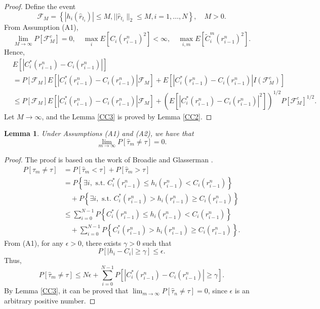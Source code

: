 \documentclass[10pt,a4paper]{amsart}
\numberwithin{equation}{section}
\newtheorem{lemma}[theo]{Lemma}
\begin{document}
\begin{proof}
Define the event
\[
 \mathcal{F}_M=\left\{\left|h_i\left(\hat{r}_{t_i}\right)\right| 
 \leq M,|| \hat{r}_{t_i} \|_2 \leq M, i=1, \dots, N\right\}, \quad M>0 .
\]
From Assumption (A1),
\[
 \lim _{M \to \infty} P\left[\mathcal{F}_M^c\right]=0, 
 \quad \max_i E\left[C_i\left(r_{i-1}^n\right)^2\right]<\infty,\quad
 \max _{i, m} E\left[\widetilde{C}_i^m\left(r_{i-1}^n\right)^2\right].
\]
Hence,
\begin{align*}
&E\left[\left|C_i^*\left(r_{i-1}^{n}\right)-C_i\left(r_{i-1}^{n}\right)\right|\right] \\
&=  P\left[\mathcal{F}_M\right] E\left[\left|C_i^*\left(r_{i-1}^{n}\right)-C_i\left(r_{i-1}^{n}\right)\right| \mathcal{F}_M\right]+E\left[\left|C_i^*\left(r_{i-1}^{n}\right)-C_i\left(r_{i-1}^{n}\right)\right| I\left(\mathcal{F}_M^c\right)\right] \\
&\leq  P\left[\mathcal{F}_M\right] E\left[\left|C_i^*\left(r_{i-1}^{n}\right)-C_i\left(r_{i-1}^{n}\right)\right| \mathcal{F}_M\right]+\left(E\left[\left|C_i^*\left(r_{i-1}^{n}\right)-C_i\left(r_{i-1}^{n}\right)\right|^2\right]\right)^{1/2} P\left[\mathcal{F}_M^c\right]^{1/2}.
\end{align*}
Let $M \to \infty$, and the Lemma \ref{CC3} is proved by Lemma \ref{CC2}.
\end{proof}

\begin{lemma}
\label{tau}
Under Assumptions {\rm (A1)} and {\rm (A2)}, we have that
 \[
 \lim _{m \to \infty} P\left[\hat{\tau}_m \neq \tau\right]=0 .
 \]
\end{lemma}

\begin{proof}
The proof is based on the work of Broadie and Glasserman \cite{broadie2004stochastic}.
\begin{align*}
P\left[\hat{\tau}_m \neq \tau\right]
&=  P\left[\hat{\tau}_m<\tau\right]+P\left[\hat{\tau}_m>\tau\right] \\
&=  P\left\{\exists i, \text{ s.t. } C_i^*\left(r_{i-1}^{n}\right) \leq h_i\left(r_{i-1}^{n}\right)< C_i\left(r_{i-1}^{n}\right)\right\} \\
&\quad +P\left\{\exists i, \text{ s.t. } C_i^*\left(r_{i-1}^{n}\right) 
 > h_i\left(r_{i-1}^{n}\right) \geq C_i\left(r_{i-1}^{n}\right)\right\} \\
&\leq  \sum_{i=0}^{N-1} P\left\{C_i^*\left(r_{i-1}^{n}\right) 
 \leq h_i\left(r_{i-1}^{n}\right)< C_i\left(r_{i-1}^{n}\right)\right\} \\
&\quad +\sum_{i=0}^{N-1} P\left\{C_i^*\left(r_{i-1}^{n}\right) 
 > h_i\left(r_{i-1}^{n}\right) \geq C_i\left(r_{i-1}^{n}\right)\right\} .
\end{align*}
From (A1), for any $\epsilon>0$, there exists $\gamma>0$ such that
\[
 P\left[\left|h_i-C_i\right| \geq \gamma\right] \leq \epsilon.
\]
Thus,
\[
 P\left[\hat{\tau}_m \neq \tau\right] 
 \leq N \epsilon+\sum_{i=0}^{N-1} P\left[\left|C_i^*\left(r_{i-1}^{n}\right)
 -C_i\left(r_{i-1}^{n}\right)\right| \geq \gamma\right].
\]
By Lemma \ref{CC3}, it can be proved that
$ \lim _{m \to \infty} P\left[\hat{\tau}_n \neq \tau\right]=0$,
since $\epsilon$ is an arbitrary positive number.
\end{proof}
\end{document}
